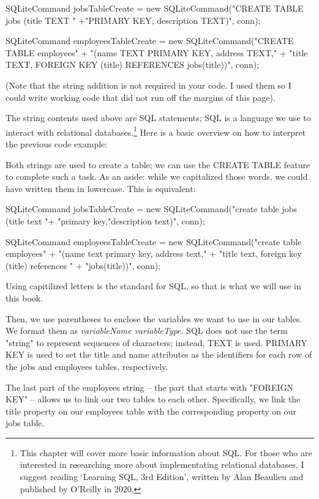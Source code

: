\documentclass[oneside, openany] {book}
\begin{document}
\begin{CSharp}
SQLiteCommand jobsTableCreate = new SQLiteCommand("CREATE TABLE jobs (title TEXT " 
+"PRIMARY KEY, description TEXT)", conn);

SQLiteCommand employeesTableCreate = new SQLiteCommand("CREATE TABLE employees" +
"(name TEXT PRIMARY KEY, address TEXT,"
                    + "title TEXT, FOREIGN KEY (title) REFERENCES jobs(title))", conn);

\end{CSharp}

(Note that the string addition is not required in your code. I used them so I could write working code that did not run off the margins of this page).

The string contents used above are SQL statements; SQL is a language we use to interact with relational databases.\footnote{This chapter will cover more basic information about SQL. For those who are interested in researching more about implementating relational databases, I suggest reading `Learning SQL, 3rd Edition', written by Alan Beaulieu and published by O'Reilly in 2020.}
Here is a basic overview on how to interpret the previous code example:

Both strings are used to create a table; we can use the CREATE TABLE feature to complete such a task. As an aside: while we capitalized those words, we could have written them in lowercase. This is equivalent:

\begin{CSharp}
SQLiteCommand jobsTableCreate = new SQLiteCommand("create table jobs (title text "+
"primary key,"description text)", conn);

SQLiteCommand employeesTableCreate = new SQLiteCommand("create table employees" + 
"(name text primary key, address text," +
"title text, foreign key (title) references " + "jobs(title))", conn);
\end{CSharp}
Using capitilized letters is the standard for SQL, so that is what we will use in this book.

Then, we use parentheses to enclose the variables we want to use in our tables. We format them as \emph{variableName variableType}. SQL does not use the term "string" to represent sequences of characters; instead, TEXT is used. PRIMARY KEY is used to set the title and name attributes as the identifiers for each row of the jobs and employees tables, respectively.

The last part of the employees string -- the part that starts with "FOREIGN KEY" -- allows us to link our two tables to each other. Specifically, we link the title property on our employees table with the corresponding property on our jobs table.
\end{document}
